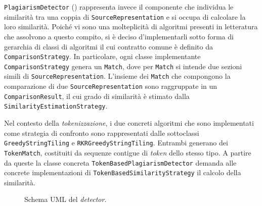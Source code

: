 \texttt{PlagiarismDetector} () rappresenta invece il componente che individua le similarità tra una coppia di \texttt{SourceRepresentation} e si occupa di calcolare la loro similarità.
%
Poiché vi sono una molteplicità di algoritmi presenti in letteratura che assolvono a questo compito, si è deciso d'implementarli sotto forma di gerarchia di classi di algoritmi il cui contratto comune è definito da \texttt{ComparisonStrategy}. 
%
In particolare, ogni classe implementante \texttt{ComparisonStrategy} genera un \texttt{Match}, dove per \texttt{Match} si intende due sezioni simili di \texttt{SourceRepresentation}.
%
L'insieme dei \texttt{Match} che compongono la comparazione di due \texttt{SourceRepresentation} sono raggruppate in un \texttt{ComparisonResult}, il cui grado di similarità è stimato dalla \texttt{SimilarityEstimationStrategy}.

Nel contesto della \textit{tokenizzazione}, i due concreti algoritmi che sono implementati come strategia di confronto sono rappresentati dalle sottoclassi \texttt{GreedyStringTiling} e \texttt{RKRGreedyStringTiling}.
%
Entrambi generano dei \texttt{TokenMatch}, costituiti da sequenze contigue di \textit{token} dello stesso tipo.
%
A partire da queste la classe concreta \texttt{TokenBasedPlagiarismDetector} demanda alle concrete implementazioni di \texttt{TokenBasedSimilarityStrategy} il calcolo della similarità.

\begin{figure}
    \caption{Schema UML del \textit{detector}.}
    \label{img:02-detector}
\end{figure}

